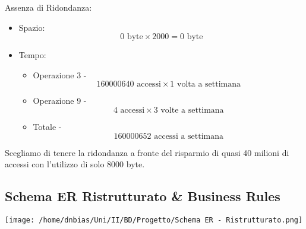 \documentclass[11pt]{article}
\begin{document}
Assenza di Ridondanza:
\begin{itemize}
\item Spazio: \[0 \text{ byte} \times 2000 = 0 \text{ byte}\]
\item Tempo:
\begin{itemize}
\item Operazione 3 - \[160000640 \text{ accessi} \times 1 \text{ volta a settimana}\]
\item Operazione 9 - \[4 \text{ accessi} \times 3 \text{ volte a settimana}\]
\item Totale - \[160000652 \text{ accessi a settimana}\]
\end{itemize}
\end{itemize}

Scegliamo di tenere la ridondanza a fronte del risparmio di quasi 40 milioni di accessi con l'utilizzo di solo 8000 byte.

\subsection{Schema ER Ristrutturato \& Business Rules}
\label{sec:org745cd07}
\begin{center}
\texttt{[image: /home/dnbias/Uni/II/BD/Progetto/Schema ER - Ristrutturato.png]}
\end{center}
\end{document}
